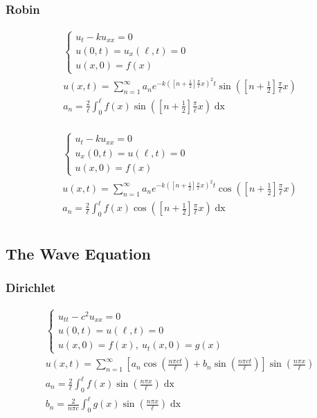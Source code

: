 \documentclass{article}
\begin{document}
\subsubsection*{Robin}
\begin{minipage}{0.5\textwidth}
\begin{gather*}
\begin{cases}
u_{t} - ku_{xx} = 0\\
u(0,t) = u_{x}(\ell,t) = 0\\
u(x,0) = f(x)
\end{cases}\\
u(x,t) = \sum_{n=1}^{\infty}a_{n}e^{-k\left(\left[n + \frac{1}{2}\right]\frac{\pi}{\ell}x\right)^{2}t}\sin{\left(\left[n + \frac{1}{2}\right]\frac{\pi}{\ell}x\right)}\\
a_{n} = \frac{2}{\ell}\int_{0}^{\ell}f(x)\sin{\left(\left[n + \frac{1}{2}\right]\frac{\pi}{\ell}x\right)}\mathop{dx}\\
\end{gather*}
\end{minipage}
\begin{minipage}{0.5\textwidth}
\begin{gather*}
\begin{cases}
u_{t} - ku_{xx} = 0\\
u_{x}(0,t) = u(\ell,t) = 0\\
u(x,0) = f(x)
\end{cases}\\
u(x,t) = \sum_{n=1}^{\infty}a_{n}e^{-k\left(\left[n + \frac{1}{2}\right]\frac{\pi}{\ell}x\right)^{2}t}\cos{\left(\left[n + \frac{1}{2}\right]\frac{\pi}{\ell}x\right)}\\
a_{n} = \frac{2}{\ell}\int_{0}^{\ell}f(x)\cos{\left(\left[n + \frac{1}{2}\right]\frac{\pi}{\ell}x\right)}\mathop{dx}\\
\end{gather*}
\end{minipage}


\subsection{The Wave Equation}
\subsubsection*{Dirichlet}
\begin{gather*}
\begin{cases}
u_{tt} - c^{2}u_{xx} = 0\\
u(0,t) = u(\ell,t) = 0\\
u(x,0) = f(x),\ u_{t}(x,0) = g(x)
\end{cases}\\
u(x,t) = \sum_{n=1}^{\infty}\left[a_{n}\cos{\left(\frac{n\pi c t}{\ell}\right)} + b_{n}\sin{\left(\frac{n\pi c t}{\ell}\right)}\right]\sin{\left(\frac{n\pi x}{\ell}\right)}\\
a_{n} = \frac{2}{\ell}\int_{0}^{\ell}f(x)\sin{\left(\frac{n\pi x}{\ell}\right)}\mathop{dx}\\
b_{n} = \frac{2}{n\pi c}\int_{0}^{\ell}g(x)\sin{\left(\frac{n\pi x}{\ell}\right)}\mathop{dx}\\
\end{gather*}
\end{document}
